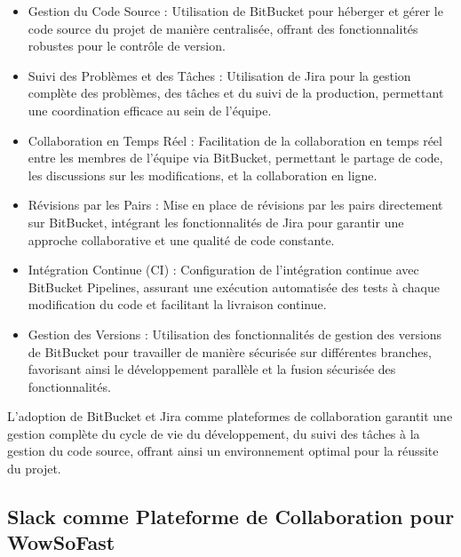\begin{itemize}
  \item Gestion du Code Source : Utilisation de BitBucket pour héberger et gérer le code source du projet de manière centralisée, offrant des fonctionnalités robustes pour le contrôle de version.
  
  \item Suivi des Problèmes et des Tâches : Utilisation de Jira pour la gestion complète des problèmes, des tâches et du suivi de la production, permettant une coordination efficace au sein de l'équipe.
  
  \item Collaboration en Temps Réel : Facilitation de la collaboration en temps réel entre les membres de l'équipe via BitBucket, permettant le partage de code, les discussions sur les modifications, et la collaboration en ligne.
  
  \item Révisions par les Pairs : Mise en place de révisions par les pairs directement sur BitBucket, intégrant les fonctionnalités de Jira pour garantir une approche collaborative et une qualité de code constante.
  
  \item Intégration Continue (CI) : Configuration de l'intégration continue avec BitBucket Pipelines, assurant une exécution automatisée des tests à chaque modification du code et facilitant la livraison continue.
  
  \item Gestion des Versions : Utilisation des fonctionnalités de gestion des versions de BitBucket pour travailler de manière sécurisée sur différentes branches, favorisant ainsi le développement parallèle et la fusion sécurisée des fonctionnalités.
\end{itemize}

L'adoption de BitBucket et Jira comme plateformes de collaboration garantit une gestion complète du cycle de vie du développement, du suivi des tâches à la gestion du code source, offrant ainsi un environnement optimal pour la réussite du projet.

\subsection{Slack comme Plateforme de Collaboration pour WowSoFast}

